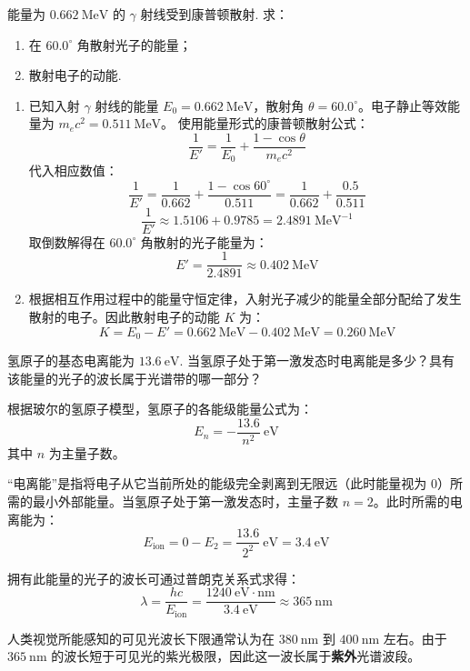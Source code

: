 \begin{exercise}\label{ex:22.10}
能量为 $0.662 \ \mathrm{MeV}$ 的 $\gamma$ 射线受到康普顿散射. 求：
\begin{enumerate}
  \item[(a)] 在 $60.0^\circ$ 角散射光子的能量；
  \item[(b)] 散射电子的动能.
\end{enumerate}
\end{exercise}
\begin{solution}
\begin{enumerate}
    \item[(a)] 已知入射 $\gamma$ 射线的能量 $E_0 = 0.662 \ \mathrm{MeV}$，散射角 $\theta = 60.0^\circ$。电子静止等效能量为 $m_e c^2 = 0.511 \ \mathrm{MeV}$。
    使用能量形式的康普顿散射公式：
    $$ \frac{1}{E'} = \frac{1}{E_0} + \frac{1 - \cos\theta}{m_e c^2} $$
    代入相应数值：
    $$ \frac{1}{E'} = \frac{1}{0.662} + \frac{1 - \cos 60^\circ}{0.511} = \frac{1}{0.662} + \frac{0.5}{0.511} $$
    $$ \frac{1}{E'} \approx 1.5106 + 0.9785 = 2.4891 \ \mathrm{MeV^{-1}} $$
    取倒数解得在 $60.0^\circ$ 角散射的光子能量为：
    $$ E' = \frac{1}{2.4891} \approx 0.402 \ \mathrm{MeV} $$
    
    \item[(b)] 根据相互作用过程中的能量守恒定律，入射光子减少的能量全部分配给了发生散射的电子。因此散射电子的动能 $K$ 为：
    $$ K = E_0 - E' = 0.662 \ \mathrm{MeV} - 0.402 \ \mathrm{MeV} = 0.260 \ \mathrm{MeV} $$
\end{enumerate}
\end{solution}

\begin{exercise}\label{ex:22.11}
氢原子的基态电离能为 $13.6 \ \mathrm{eV}$. 当氢原子处于第一激发态时电离能是多少？具有该能量的光子的波长属于光谱带的哪一部分？
\end{exercise}
\begin{solution}
根据玻尔的氢原子模型，氢原子的各能级能量公式为：
$$ E_n = - \frac{13.6}{n^2} \ \mathrm{eV} $$
其中 $n$ 为主量子数。

“电离能”是指将电子从它当前所处的能级完全剥离到无限远（此时能量视为 $0$）所需的最小外部能量。当氢原子处于第一激发态时，主量子数 $n = 2$。此时所需的电离能为：
$$ E_{\text{ion}} = 0 - E_2 = \frac{13.6}{2^2} \ \mathrm{eV} = 3.4 \ \mathrm{eV} $$

拥有此能量的光子的波长可通过普朗克关系式求得：
$$ \lambda = \frac{hc}{E_{\text{ion}}} = \frac{1240 \ \mathrm{eV \cdot nm}}{3.4 \ \mathrm{eV}} \approx 365 \ \mathrm{nm} $$

人类视觉所能感知的可见光波长下限通常认为在 $380 \ \mathrm{nm}$ 到 $400 \ \mathrm{nm}$ 左右。由于 $365 \ \mathrm{nm}$ 的波长短于可见光的紫光极限，因此这一波长属于\textbf{紫外}光谱波段。
\end{solution}

